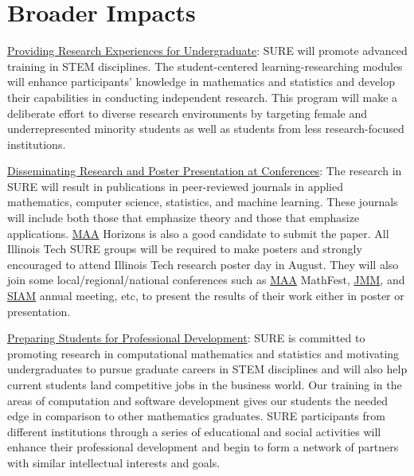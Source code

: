 \documentclass[11pt]{NSFamsart}
\newcommand{\Upara}[1]{\noindent\underline{\upshape #1}:}
\newcommand{\MAA}{\hyperlink{MAAlink}{MAA}\xspace}
\newcommand{\JMM}{\hyperlink{JMMlink}{JMM}\xspace}
\newcommand{\SIAM}{\hyperlink{SIAMlink}{SIAM}\xspace}
\begin{document}
\section{Broader Impacts}
\begin{sloppypar}\Upara{Providing Research Experiences for Undergraduate} 
SURE will promote advanced training in STEM
disciplines. The student-centered learning-researching modules will enhance participants’ knowledge in
mathematics and statistics and develop their capabilities in conducting independent research. This program will make a deliberate effort to diverse research environments by targeting female and underrepresented minority students as well as students from less research-focused institutions. \end{sloppypar}

\Upara{Disseminating Research and Poster Presentation at Conferences}
The research in SURE will result in publications in peer-reviewed journals in applied mathematics, computer science, statistics, and machine learning. These journals will include both those that emphasize theory and those that emphasize applications. \MAA Horizons is also a good candidate to submit the paper. All Illinois Tech SURE groups will be required to make posters and strongly encouraged to attend Illinois Tech research poster day in August. They will also join some local/regional/national conferences such as \MAA MathFest, \JMM, and \SIAM annual meeting, etc, to present the results of their work either in poster or presentation.


\Upara{Preparing Students for Professional  Development} 
SURE is committed to promoting research in computational mathematics and statistics and motivating undergraduates to pursue graduate careers in STEM disciplines and will also help current students land competitive jobs in the business world. Our training in the areas of computation and software development gives our students the needed edge in comparison to other mathematics graduates. SURE participants from different institutions through a series of educational and social activities will enhance their professional development and begin to form a network of partners with similar intellectual interests and goals. 
\end{document}
